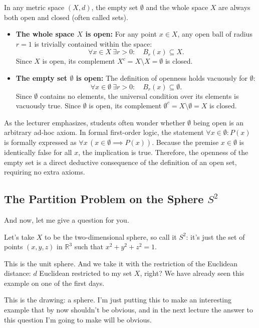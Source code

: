 \begin{content}
In any metric space $(X, d)$, the empty set $\emptyset$ and the whole space $X$ are always both open and closed (often called  sets).
\begin{itemize}
    \item \textbf{The whole space $X$ is open:} For any point $x \in X$, any open ball of radius $r = 1$ is trivially contained within the space:
    \[
    \forall x \in X \ \exists r > 0 \colon \quad B_r(x) \subseteq X.
    \]
    Since $X$ is open, its complement $X^c = X \setminus X = \emptyset$ is closed.
    \item \textbf{The empty set $\emptyset$ is open:} The definition of openness holds vacuously for $\emptyset$:
    \[
    \forall x \in \emptyset \ \exists r > 0 \colon \quad B_r(x) \subseteq \emptyset.
    \]
    Since $\emptyset$ contains no elements, the universal condition over its elements is vacuously true. Since $\emptyset$ is open, its complement $\emptyset^c = X \setminus \emptyset = X$ is closed.
\end{itemize}

\begin{steps}
As the lecturer emphasizes, students often wonder whether $\emptyset$ being open is an arbitrary ad-hoc axiom. In formal first-order logic, the statement $\forall x \in \emptyset \colon P(x)$ is formally expressed as $\forall x \, (x \in \emptyset \implies P(x))$. Because the premise $x \in \emptyset$ is identically false for all $x$, the implication is true. Therefore, the openness of the empty set is a direct deductive consequence of the definition of an open set, requiring no extra axioms.
\end{steps}
\end{content}

\subsection{The Partition Problem on the Sphere \texorpdfstring{$S^2$}{S2}}

\begin{speech}[01:16:27 - 01:17:54]
And now, let me give a question for you. 

Let's take $X$ to be the two-dimensional sphere, so call it $S^2$:  it's just the set of points $(x, y, z)$ in $\mathbb{R}^3$ such that $x^2 + y^2 + z^2 = 1$. 

This is the unit sphere. And we take it with the restriction of the Euclidean distance:  $d$ Euclidean restricted to my set $X$, right? We have already seen this example on one of the first days.

This is the drawing: a sphere.  I'm just putting this to make an interesting example that by now shouldn't be obvious, and in the next lecture the answer to this question I'm going to make will be obvious.
\end{speech}

